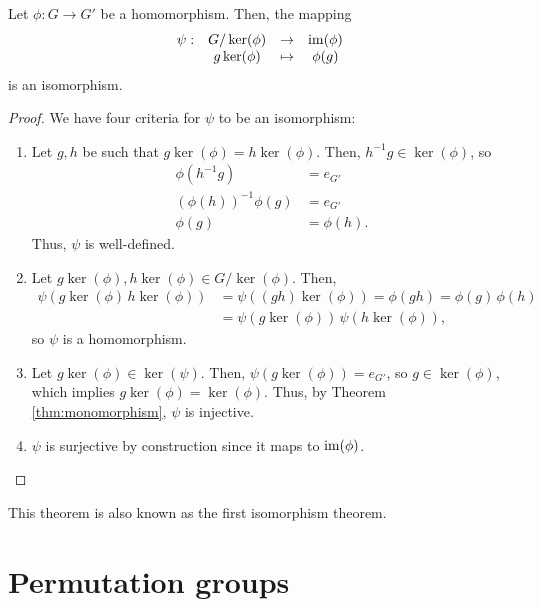 \begin{thm}
Let $ \phi:G\to G' $ be a homomorphism. Then, the mapping
\begin{equation*}
    \begin{array}{rccc}
        \psi: & G/\ker(\phi) & \to & \operatorname{im}(\phi) \\
        & g\ker(\phi) & \mapsto & \phi(g)
    \end{array}
\end{equation*}
is an isomorphism.
\end{thm}
\begin{proof}
We have four criteria for $ \psi $ to be an isomorphism:
\begin{enumerate}
    \item Let $ g,h $ be such that $ g\ker(\phi)=h\ker(\phi) $. Then, $ h^{-1}g\in\ker(\phi) $, so
    \begin{align*}
        \phi(h^{-1}g) &= e_{G'} \\
        (\phi(h))^{-1}\phi(g) &= e_{G'} \\
        \phi(g) &= \phi(h).
    \end{align*}
    Thus, $ \psi $ is well-defined.

    \item Let $ g\ker(\phi),h\ker(\phi)\in G/\ker(\phi) $. Then,
    \begin{align*}
        \psi(g\ker(\phi)\,h\ker(\phi)) &= \psi((gh)\ker(\phi))=\phi(gh)=\phi(g)\,\phi(h) \\
        &= \psi(g\ker(\phi))\,\psi(h\ker(\phi)),
    \end{align*}
    so $ \psi $ is a homomorphism.

    \item Let $ g\ker(\phi)\in\ker(\psi) $. Then, $ \psi(g\ker(\phi))=e_{G'} $, so $ g\in\ker(\phi) $, which implies $ g\ker(\phi)=\ker(\phi) $. Thus, by Theorem \ref{thm:monomorphism}, $ \psi $ is injective.

    \item $ \psi $ is surjective by construction since it maps to $ \operatorname{im}(\phi) $.\qedhere
\end{enumerate}
\end{proof}

This theorem is also known as the first isomorphism theorem.

\section{Permutation groups}

